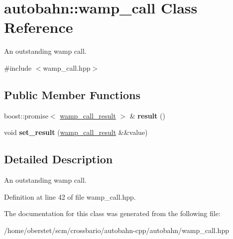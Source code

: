 \hypertarget{classautobahn_1_1wamp__call}{}\section{autobahn\+:\+:wamp\+\_\+call Class Reference}
\label{classautobahn_1_1wamp__call}


An outstanding wamp call.  




{\ttfamily \#include $<$wamp\+\_\+call.\+hpp$>$}

\subsection*{Public Member Functions}
\begin{DoxyCompactItemize}
\item 
boost\+::promise$<$ \hyperlink{classautobahn_1_1wamp__call__result}{wamp\+\_\+call\+\_\+result} $>$ \& {\bfseries result} ()\hypertarget{classautobahn_1_1wamp__call_a263297009ad4278d2c96a3ed8c98b366}{}\label{classautobahn_1_1wamp__call_a263297009ad4278d2c96a3ed8c98b366}

\item 
void {\bfseries set\+\_\+result} (\hyperlink{classautobahn_1_1wamp__call__result}{wamp\+\_\+call\+\_\+result} \&\&value)\hypertarget{classautobahn_1_1wamp__call_a58a9d77418091dc6cab249f54c987d8a}{}\label{classautobahn_1_1wamp__call_a58a9d77418091dc6cab249f54c987d8a}

\end{DoxyCompactItemize}


\subsection{Detailed Description}
An outstanding wamp call. 

Definition at line 42 of file wamp\+\_\+call.\+hpp.



The documentation for this class was generated from the following file\+:\begin{DoxyCompactItemize}
\item 
/home/oberstet/scm/crossbario/autobahn-\/cpp/autobahn/wamp\+\_\+call.\+hpp\end{DoxyCompactItemize}
